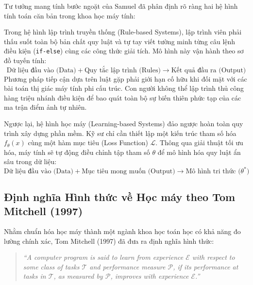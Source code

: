 Tư tưởng mang tính bước ngoặt của Samuel đã phân định rõ ràng hai hệ hình tính toán căn bản trong khoa học máy tính:

Trong hệ hình lập trình truyền thống (Rule-based Systems), lập trình viên phải thấu suốt toàn bộ bản chất quy luật và tự tay viết tường minh từng câu lệnh điều kiện (\texttt{if-else}) cùng các công thức giải tích. Mô hình này vận hành theo sơ đồ tuyến tính:
\begin{equation}
\text{Dữ liệu đầu vào (Data)} + \text{Quy tắc lập trình (Rules)} \longrightarrow \text{Kết quả đầu ra (Output)}
\end{equation}
Phương pháp tiếp cận dựa trên luật gặp phải giới hạn cố hữu khi đối mặt với các bài toán thị giác máy tính phi cấu trúc. Con người không thể lập trình thủ công hàng triệu nhánh điều kiện để bao quát toàn bộ sự biến thiên phức tạp của các ma trận điểm ảnh tự nhiên.

Ngược lại, hệ hình học máy (Learning-based Systems) đảo ngược hoàn toàn quy trình xây dựng phần mềm. Kỹ sư chỉ cần thiết lập một kiến trúc tham số hóa $f_\theta(x)$ cùng một hàm mục tiêu (Loss Function) $\mathcal{L}$. Thông qua giải thuật tối ưu hóa, máy tính sẽ tự động điều chỉnh tập tham số $\theta$ để mô hình hóa quy luật ẩn sâu trong dữ liệu:
\begin{equation}
\text{Dữ liệu đầu vào (Data)} + \text{Mục tiêu mong muốn (Output)} \longrightarrow \text{Mô hình tri thức ($\theta^*$)}
\end{equation}

\subsection{Định nghĩa Hình thức về Học máy theo Tom Mitchell (1997)}

Nhằm chuẩn hóa học máy thành một ngành khoa học toán học có khả năng đo lường chính xác, Tom Mitchell (1997) đã đưa ra định nghĩa hình thức:
\begin{quote}
\textit{``A computer program is said to learn from experience $\mathcal{E}$ with respect to some class of tasks $\mathcal{T}$ and performance measure $\mathcal{P}$, if its performance at tasks in $\mathcal{T}$, as measured by $\mathcal{P}$, improves with experience $\mathcal{E}$.''}
\end{quote}

